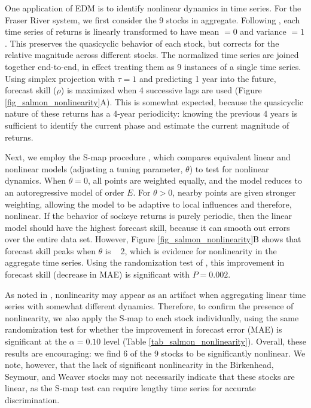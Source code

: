 One application of EDM is to identify nonlinear dynamics in time series. For the Fraser River system, we first consider the 9 stocks in aggregate. Following \cite{Hsieh_2008}, each time series of returns is linearly transformed to have mean $= 0$ and variance $= 1$. This preserves the quasicyclic behavior of each stock, but corrects for the relative magnitude across different stocks. The normalized time series are joined together end-to-end, in effect treating them as 9 instances of a single time series. Using simplex projection with $\tau = 1$ and predicting 1 year into the future, forecast skill ($\rho$) is maximized when 4 successive lags are used (Figure \ref{fig_salmon_nonlinearity}A). This is somewhat expected, because the quasicyclic nature of these returns has a 4-year periodicity: knowing the previous 4 years is sufficient to identify the current phase and estimate the current magnitude of returns.

Next, we employ the S-map procedure \cite{Sugihara_1994}, which compares equivalent linear and nonlinear models (adjusting a tuning parameter, $\theta$) to test for nonlinear dynamics. When $\theta = 0$, all points are weighted equally, and the model reduces to an autoregressive model of order $E$. For $\theta > 0$, nearby points are given stronger weighting, allowing the model to be adaptive to local influences and therefore, nonlinear. If the behavior of sockeye returns is purely periodic, then the linear model should have the highest forecast skill, because it can smooth out errors over the entire data set. However, Figure \ref{fig_salmon_nonlinearity}B shows that forecast skill peaks when $\theta$ is ~ 2, which is evidence for nonlinearity in the aggregate time series. Using the randomization test of \cite{Hsieh_2006, Glaser_2014a}, this improvement in forecast skill (decrease in MAE) is significant with $P = 0.002$.

As noted in \cite{Hsieh_2008}, nonlinearity may appear as an artifact when aggregating linear time series with somewhat different dynamics. Therefore, to confirm the presence of nonlinearity, we also apply the S-map to each stock individually, using the same randomization test for whether the improvement in forecast error (MAE) is significant at the $\alpha = 0.10$ level (Table \ref{tab_salmon_nonlinearity}). Overall, these results are encouraging: we find 6 of the 9 stocks to be significantly nonlinear. We note, however, that the lack of significant nonlinearity in the Birkenhead, Seymour, and Weaver stocks may not necessarily indicate that these stocks are linear, as the S-map test can require lengthy time series for accurate discrimination.
	
